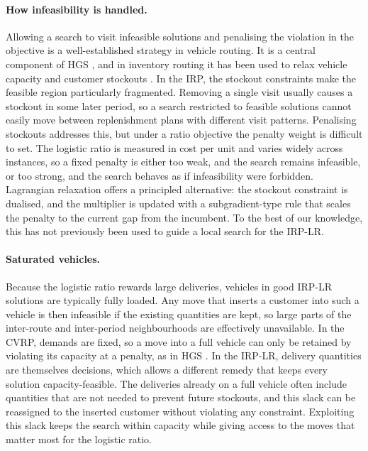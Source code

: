 \documentclass{article}
\begin{document}
\paragraph{How infeasibility is handled.}
Allowing a search to visit infeasible solutions and penalising the violation
in the objective is a well-established strategy in vehicle routing. It is a
central component of HGS \citep{vidal2022hybrid}, and in inventory routing
it has been used to relax vehicle capacity
\citep{archetti2012hybrid,castro2026hybrid} and customer stockouts
\citep{zhao2025large}. In the IRP, the stockout constraints make the
feasible region particularly fragmented. Removing a single visit usually
causes a stockout in some later period, so a search restricted to feasible
solutions cannot easily move between replenishment plans with different
visit patterns. Penalising stockouts addresses this, but under a ratio
objective the penalty weight is difficult to set. The logistic ratio is
measured in cost per unit and varies widely across instances, so a fixed
penalty is either too weak, and the search remains infeasible, or too
strong, and the search behaves as if infeasibility were forbidden. Lagrangian
relaxation \citep{fisher1981lagrangian} offers a principled alternative: the
stockout constraint is dualised, and the multiplier is updated with a
subgradient-type rule that scales the penalty to the current gap from the
incumbent. To the best of our knowledge, this has not previously been used
to guide a local search for the IRP-LR.

\paragraph{Saturated vehicles.}
Because the logistic ratio rewards large deliveries, vehicles in good
IRP-LR solutions are typically fully loaded. Any move that inserts a
customer into such a vehicle is then infeasible if the existing quantities
are kept, so large parts of the inter-route and inter-period neighbourhoods
are effectively unavailable. In the CVRP, demands are fixed, so a move into
a full vehicle can only be retained by violating its capacity at a penalty,
as in HGS \citep{vidal2022hybrid}. In the IRP-LR, delivery quantities are
themselves decisions, which allows a different remedy that keeps every
solution capacity-feasible. The deliveries already on a
full vehicle often include quantities that are not needed to prevent future
stockouts, and this slack can be reassigned to the inserted customer without
violating any constraint. Exploiting this slack keeps the search within
capacity while giving access to the moves that matter most for the
logistic ratio.
\end{document}
